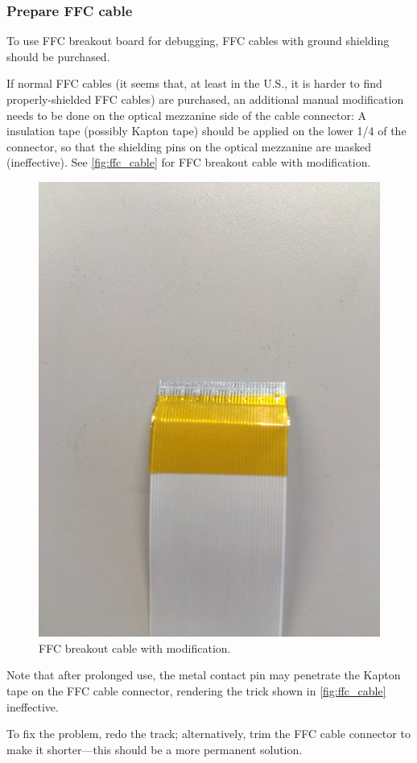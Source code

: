 \subsubsection{Prepare FFC cable}
To use FFC breakout board for debugging, FFC cables with ground shielding should
be purchased.

If normal FFC cables (it seems that, at least in the U.S., it is harder to find
properly-shielded FFC cables) are purchased, an additional manual modification
needs to be done on the optical mezzanine side of the cable connector:
A insulation tape (possibly Kapton tape) should be applied on the lower 1/4 of
the connector, so that the shielding pins on the optical mezzanine are masked
(ineffective).
See \autoref{fig:ffc_cable} for FFC breakout cable with modification.

\begin{figure}[!ht]
    \centering
    \includegraphics[width=0.9\linewidth]{res/ffc_breakout_cable_with_tape.jpg}
    \caption{FFC breakout cable with modification.}
    \label{fig:ffc_cable}
\end{figure}

\begin{leftbar}
    Note that after prolonged use, the metal contact pin may penetrate the
    Kapton tape on the FFC cable connector, rendering the trick shown in
    \autoref{fig:ffc_cable} ineffective.

    To fix the problem, redo the track;
    alternatively, trim the FFC cable connector to make it shorter---this should
    be a more permanent solution.
\end{leftbar}
